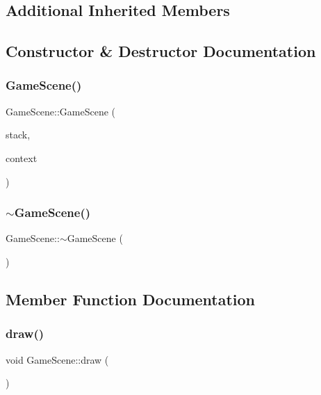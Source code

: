 \subsection*{Additional Inherited Members}


\subsection{Constructor \& Destructor Documentation}
\mbox{\label{class_game_scene_a09ae1eacea6ea92074d008c016e0ed1f}} 
\subsubsection{\texorpdfstring{Game\+Scene()}{GameScene()}}
{\footnotesize\ttfamily Game\+Scene\+::\+Game\+Scene (\begin{DoxyParamCaption}\item[{\hyperlink{class_scene_stack}{Scene\+Stack} \&}]{stack,  }\item[{\hyperlink{struct_scene_1_1_context}{Context}}]{context }\end{DoxyParamCaption})}

\mbox{\label{class_game_scene_add5bc48c372aaa7f526c02558a8adf00}} 
\subsubsection{\texorpdfstring{$\sim$\+Game\+Scene()}{~GameScene()}}
{\footnotesize\ttfamily Game\+Scene\+::$\sim$\+Game\+Scene (\begin{DoxyParamCaption}{ }\end{DoxyParamCaption})}



\subsection{Member Function Documentation}
\mbox{\label{class_game_scene_ae9eb60cbb8fa55eeb07b951e3d83f426}} 
\subsubsection{\texorpdfstring{draw()}{draw()}}
{\footnotesize\ttfamily void Game\+Scene\+::draw (\begin{DoxyParamCaption}{ }\end{DoxyParamCaption})\hspace{0.3cm}{\ttfamily [virtual]}}



